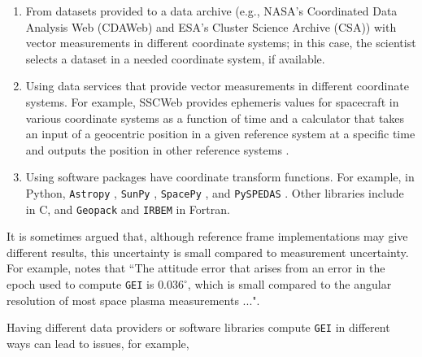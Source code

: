 \documentclass[draft]{agujournal2019}
\begin{document}
\begin{enumerate}

    \parskip 0.1in 

    \item From datasets provided to a data archive (e.g., NASA's Coordinated Data Analysis Web (CDAWeb) and ESA's Cluster Science Archive (CSA)) with vector measurements in different coordinate systems; in this case, the scientist selects a dataset in a needed coordinate system, if available.

    \item Using data services that provide vector measurements in different coordinate systems. For example, SSCWeb provides ephemeris values for spacecraft in various coordinate systems as a function of time \cite{SSCWeb} and a calculator that takes an input of a geocentric position in a given reference system at a specific time and outputs the position in other reference systems \cite{SSCWebCoordinateCalculator}.

    \item Using software packages have coordinate transform functions. For example, in Python, \texttt{Astropy} \cite{AstroPy2022}, \texttt{SunPy} \cite{SunPy}, \texttt{SpacePy} \cite{SpacePy}, and \texttt{PySPEDAS} \cite{Angelopoulos2024}. Other libraries include \cite{cxform} in C, and \texttt{Geopack} \cite{Tsyganenko2008} and \texttt{IRBEM} \cite{IRBEM2022} in Fortran.

\end{enumerate}


It is sometimes argued that, although reference frame implementations may give different results, this uncertainty is small compared to measurement uncertainty. For example,  notes that ``The attitude error that arises from an error in the epoch used to compute \texttt{GEI} is $0.036^\circ$, which is small compared to the angular resolution of most space plasma measurements ...". 

Having different data providers or software libraries compute \texttt{GEI} in different ways can lead to issues, for example, 
\end{document}
